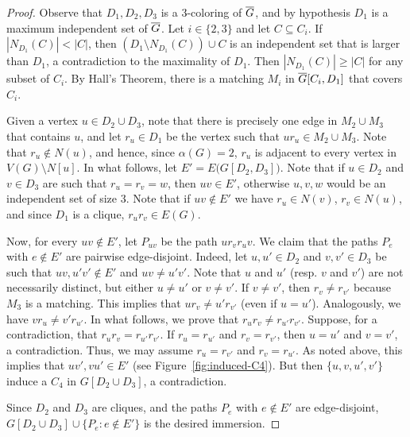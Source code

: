 \documentclass[a4paper,12pt]{article}
\begin{document}
\begin{proof}
	Observe that \(D_1,D_2,D_3\) is a \(3\)-coloring of \(\overline{G}\),
	and by hypothesis \(D_1\) is a maximum independent set of \(\overline{G}\).
	Let \(i\in\{2,3\}\) and let \(C\subseteq C_i\).
	If \(|N_{D_1}(C)| < |C|\), 
	then \((D_1\setminus N_{D_1}(C))\cup C\) is an independent set that is larger than \(D_1\),
	a contradiction to the maximality of \(D_1\).
	Then \(|N_{D_1}(C)| \geq |C|\) for any subset of \(C_i\).
	By Hall's Theorem, there is a matching \(M_i\) in \(\overline{G}[C_i,D_1]\) that covers \(C_i\).
	
	Given a vertex \(u\in D_2 \cup D_3\), 
	note that there is precisely one edge in \(M_2\cup M_3\) that contains \(u\),
	and let \(r_u\in D_1\) be the vertex such that \(ur_u\in M_2\cup M_3\).
	Note that \(r_u \notin N(u)\),
	and hence, since \(\alpha(G) = 2\), \(r_u\) is adjacent to every vertex in \(V(G)\setminus N[u]\).
	In what follows, let \(E' = E\big(G[D_2,D_3]\big)\).
	Note that if \(u\in D_2\) and \(v\in D_3\) are such that \(r_u = r_v = w\),
	then \(uv \in E'\), otherwise \(u,v,w\) would be an independent set of size \(3\).
%	
	Note that if \(uv\notin E'\) we have \(r_u\in N(v)\), \(r_v\in N(u)\),
	and since \(D_1\) is a clique, \(r_ur_v\in E(G)\).

	Now, for every \(uv\notin E'\), let \(P_{uv}\) be the path \(u r_v r_u v\).
	We claim that the paths \(P_e\) with \(e\notin E'\) are pairwise edge-disjoint.
	Indeed, let \(u,u' \in D_2\) and \(v,v' \in D_3\) be such that \(uv,u'v' \notin E'\)
	and \(uv \neq u'v'\).
	Note that \(u\) and \(u'\) (resp. \(v\) and \(v'\)) are not necessarily distinct,
	but either \(u \neq u'\) or \(v \neq v'\).
	If \(v\neq v'\), then \(r_v \neq r_{v'}\) because \(M_3\) is a matching.
	This implies that \(ur_v \neq u'r_{v'}\) (even if \(u = u'\)).
	Analogously, we have \(vr_u \neq v'r_{u'}\).
	In what follows, we prove that \(r_ur_v \neq r_{u'}r_{v'}\).
	Suppose, for a contradiction, that \(r_ur_v = r_{u'}r_{v'}\).
	If \(r_u = r_{u'}\) and \(r_v = r_{v'}\), then \(u=u'\) and \(v=v'\), a contradiction.
	Thus, we may assume \(r_u = r_{v'}\) and \(r_v = r_{u'}\).
	As noted above, this implies that \(uv',vu' \in E'\) (see Figure~\ref{fig:induced-C4}).
	But then \(\{u,v,u',v'\}\) induce a \(C_4\) in \(G[D_2\cup D_3]\),
	a contradiction.
	
	Since \(D_2\) and \(D_3\) are cliques,
	and the paths \(P_e\) with \(e\notin E'\) are edge-disjoint,
	\(G[D_2\cup D_3]\cup\{P_e : e\notin E'\}\) is the desired immersion.
\end{proof}
\end{document}
